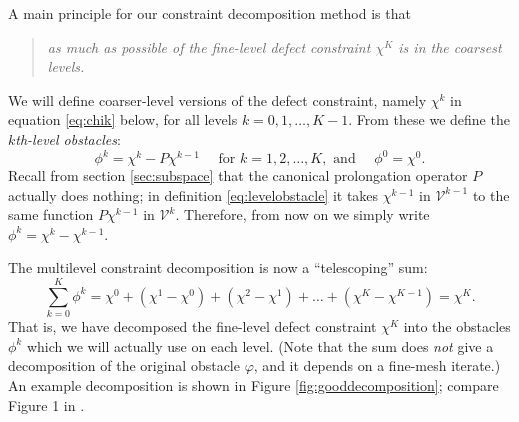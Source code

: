 \documentclass[letterpaper,final,12pt,reqno]{amsart}
\theoremstyle{claim}
\numberwithin{equation}{section}
\numberwithin{figure}{section}
\numberwithin{table}{section}
\begin{document}
A main principle for our constraint decomposition method is that
\begin{quote}
\emph{as much as possible of the fine-level defect constraint $\chi^K$ is in the coarsest levels.}
\end{quote}
We will define coarser-level versions of the defect constraint, namely $\chi^k$ in equation \eqref{eq:chik} below, for all levels $k=0,1,\dots,K-1$.  From these we define the \emph{$k$th-level obstacles}:
\begin{equation}
  \phi^k = \chi^k - P\chi^{k-1} \quad \text{ for } k=1,2,\dots,K, \text{ and } \quad \phi^0 = \chi^0.  \label{eq:levelobstacle}
\end{equation}
Recall from section \ref{sec:subspace} that the canonical prolongation operator $P$ actually does nothing; in definition \eqref{eq:levelobstacle} it takes $\chi^{k-1}$ in $\mathcal{V}^{k-1}$ to the same function $P\chi^{k-1}$ in $\mathcal{V}^k$.  Therefore, from now on we simply write $\phi^k = \chi^k - \chi^{k-1}$.

The multilevel constraint decomposition is now a ``telescoping'' sum:
\begin{equation}
  \sum_{k=0}^K \phi^k = \chi^0 + (\chi^1 - \chi^0) + (\chi^2 - \chi^1) + \dots + (\chi^K - \chi^{K-1}) = \chi^K.  \label{eq:telescopingdecomposition}
\end{equation}
That is, we have decomposed the fine-level defect constraint $\chi^K$ into the obstacles $\phi^k$ which we will actually use on each level.  (Note that the sum does \emph{not} give a decomposition of the original obstacle $\varphi$, and it depends on a fine-mesh iterate.)  An example decomposition is shown in Figure \ref{fig:gooddecomposition}; compare Figure 1 in \cite{GraeserKornhuber2009}.
\end{document}
